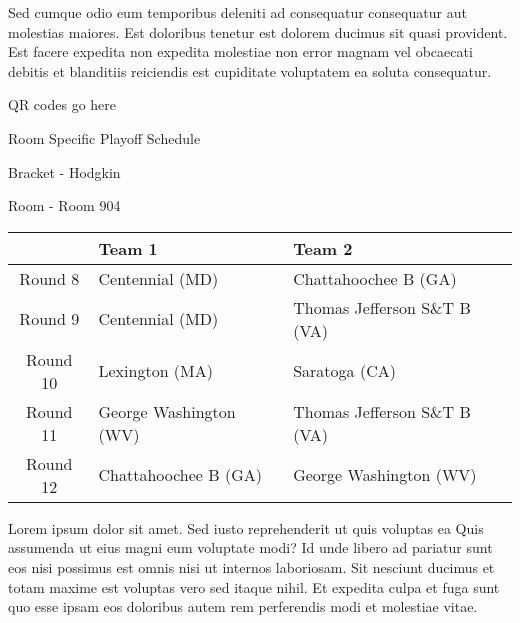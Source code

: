 \documentclass{article}%
\begin{document}
\newline%
Sed cumque odio eum temporibus deleniti ad consequatur consequatur aut molestias maiores. Est doloribus tenetur est dolorem ducimus sit quasi provident. Est facere expedita non expedita molestiae non error magnam vel obcaecati debitis et blanditiis reiciendis est cupiditate voluptatem ea soluta consequatur.%
\vspace*{140pt}%
\begin{center}%
\begin{Huge}%
QR codes go here%
\end{Huge}%
\end{center}%
\newpage%
\begin{center}%
\begin{Huge}%
Room Specific Playoff Schedule%
\end{Huge}%
\vspace*{8pt}%
\linebreak%
\begin{Large}%
Bracket {-} Hodgkin%
\end{Large}%
\vspace*{8pt}%
\linebreak%
\vspace*{8pt}%
\begin{Large}%
Room {-} Room 904%
\end{Large}%
\end{center}%
%
\begin{tabularx}{\textwidth}{|c|Y|Y|}%
\hline%
&Team 1&Team 2\\%
\hline%
Round 8&Centennial (MD)&Chattahoochee B (GA)\\%
Round 9&Centennial (MD)&Thomas Jefferson S\&T B (VA)\\%
Round 10&Lexington (MA)&Saratoga (CA)\\%
Round 11&George Washington (WV)&Thomas Jefferson S\&T B (VA)\\%
Round 12&Chattahoochee B (GA)&George Washington (WV)\\%
\hline%
\end{tabularx}%
\vspace*{8pt}%
\newline%
Lorem ipsum dolor sit amet. Sed iusto reprehenderit ut quis voluptas ea Quis assumenda ut eius magni eum voluptate modi? Id unde libero ad pariatur sunt eos nisi possimus est omnis nisi ut internos laboriosam. Sit nesciunt ducimus et totam maxime est voluptas vero sed itaque nihil. Et expedita culpa et fuga sunt quo esse ipsam eos doloribus autem rem perferendis modi et molestiae vitae.\newline%
\end{document}
